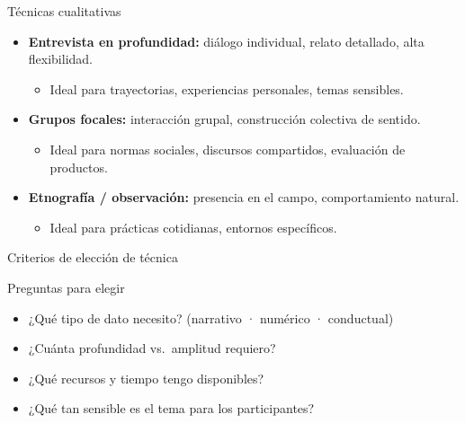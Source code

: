 \documentclass[aspectratio=169, 12pt]{beamer}
\begin{document}
\begin{frame}{Técnicas cualitativas}
  \begin{itemize}
    \item \textbf{Entrevista en profundidad:} diálogo individual, relato detallado, alta flexibilidad.
    \begin{itemize}
      \item Ideal para trayectorias, experiencias personales, temas sensibles.
    \end{itemize}
    \item \textbf{Grupos focales:} interacción grupal, construcción colectiva de sentido.
    \begin{itemize}
      \item Ideal para normas sociales, discursos compartidos, evaluación de productos.
    \end{itemize}
    \item \textbf{Etnografía / observación:} presencia en el campo, comportamiento natural.
    \begin{itemize}
      \item Ideal para prácticas cotidianas, entornos específicos.
    \end{itemize}
  \end{itemize}
\end{frame}

\begin{frame}{Criterios de elección de técnica}
  \begin{block}{Preguntas para elegir}
    \begin{itemize}
      \item ¿Qué tipo de dato necesito? (narrativo · numérico · conductual)
      \item ¿Cuánta profundidad vs.\ amplitud requiero?
      \item ¿Qué recursos y tiempo tengo disponibles?
      \item ¿Qué tan sensible es el tema para los participantes?
    \end{itemize}
  \end{block}
\end{frame}

\begin{frame}[plain]
\end{frame}
\end{document}
